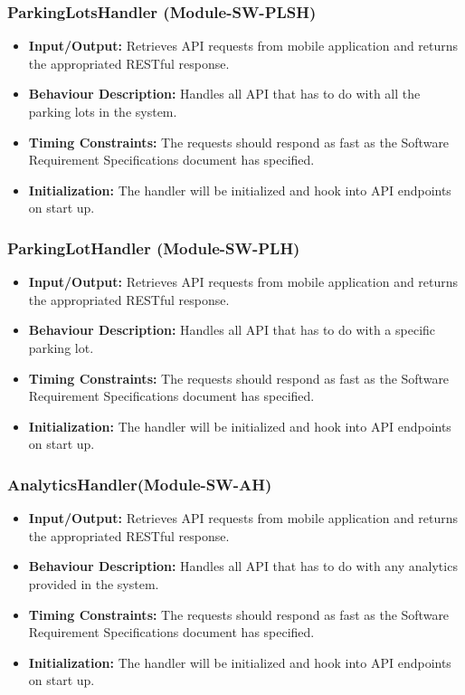 \documentclass[]{article}
\begin{document}
	\subsubsection{ParkingLotsHandler (Module-SW-PLSH)}
	\begin{itemize}
		\item \textbf{Input/Output:} Retrieves API requests from mobile application and returns the appropriated RESTful response.
		\item \textbf{Behaviour Description:} Handles all API that has to do with all the parking lots in the system.
		\item \textbf{Timing Constraints:} The requests should respond as fast as the Software Requirement Specifications document has specified.
		\item \textbf{Initialization:} The handler will be initialized and hook into API endpoints on start up.
	\end{itemize}
	
	\subsubsection{ParkingLotHandler (Module-SW-PLH)}
	\begin{itemize}
		\item \textbf{Input/Output:} Retrieves API requests from mobile application and returns the appropriated RESTful response.
		\item \textbf{Behaviour Description:} Handles all API that has to do with a specific parking lot.
		\item \textbf{Timing Constraints:} The requests should respond as fast as the Software Requirement Specifications document has specified.
		\item \textbf{Initialization:} The handler will be initialized and hook into API endpoints on start up.
	\end{itemize}
	
	\subsubsection{AnalyticsHandler(Module-SW-AH)}
	\begin{itemize}
		\item \textbf{Input/Output:} Retrieves API requests from mobile application and returns the appropriated RESTful response.
		\item \textbf{Behaviour Description:} Handles all API that has to do with any analytics provided in the system.
		\item \textbf{Timing Constraints:} The requests should respond as fast as the Software Requirement Specifications document has specified.
		\item \textbf{Initialization:} The handler will be initialized and hook into API endpoints on start up.
	\end{itemize}
	
\end{document}
